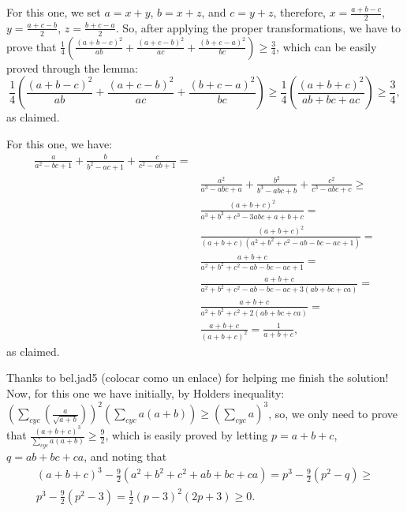 \documentclass[12pt]{minimal}
\begin{document}
    For this one, we set $a = x + y$, $b = x + z$, and $c = y + z$, therefore,
    $x = \frac{a + b - c}{2}$, $y = \frac{a + c - b}{2}$, $z = \frac{b + c - a}{2}$.
    So, after applying the proper transformations, we have to prove that
    $\frac{1}{4}\left(\frac{(a + b - c)^2}{ab} + \frac{(a + c - b)^2}{ac} +
    \frac{(b + c - a)^2}{bc}\right) \geq \frac{3}{4}$, which can be easily proved
    through the lemma:
    $$\frac{1}{4}\left(\frac{(a + b - c)^2}{ab} + \frac{(a + c - b)^2}{ac} +
    \frac{(b + c - a)^2}{bc}\right) \geq
    \frac{1}{4}\left( \frac{(a + b + c)^2}{ab + bc + ac}\right) \geq \frac{3}{4},$$
    as claimed.

    For this one, we have:
    \begin{align*}
        \frac{a}{a^2 - bc + 1} + \frac{b}{b^2 - ac + 1} + \frac{c}{c^2 -ab + 1} = \\
        & \frac{a^2}{a^3 - abc + a} + \frac{b^2}{b^3 - abc + b} + \frac{c^2}{c^3 - abc + c} \geq \\
        & \frac{(a + b + c)^2}{a^3 + b^3 + c^3 - 3abc + a + b + c} = \\
        & \frac{(a + b + c)^2}{(a + b + c)(a^2 + b^2 + c^2 - ab - bc - ac + 1)} = \\
        & \frac{a + b + c}{a^2 + b^2 + c^2 - ab - bc - ac + 1} = \\
        & \frac{a + b + c}{a^2 + b^2 + c^2 - ab - bc - ac + 3(ab + bc + ca)} = \\
        & \frac{a + b + c}{a^2 + b^2 + c^2 + 2(ab + bc + ca)} = \\
        & \frac{a + b + c}{(a + b + c)^2} = \frac{1}{a + b + c},
    \end{align*}
    as claimed.

    Thanks to bel.jad5 (colocar como un enlace) for helping me finish the solution!
    Now, for this one we have initially, by Holders inequality:
    $(\sum_{cyc}(\frac{a}{\sqrt{a + b}}))^2(\sum_{cyc}a(a + b)) \geq (\sum_{cyc}a)^3$,
    so, we only need to prove that
    $\frac{(a + b + c)^3}{\sum_{cyc}a(a + b)} \geq \frac{9}{2}$,
    which is easily proved by letting $p = a + b + c$, $q = ab + bc + ca$, and noting that
    \begin{align*}
    	(a + b + c)^3 - \frac{9}{2}(a^2 + b^2 + c^2 + ab+ bc+ ca) = p^3 - \frac{9}{2}(p^2 - q) \geq \\
		p^3 - \frac{9}{2}(p^2 - 3) = \frac{1}{2}(p - 3)^2(2p + 3) \geq 0.
    \end{align*}
\end{document}

